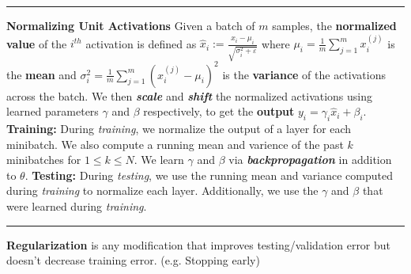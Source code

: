 \documentclass{article}
\renewcommand{\bf}[1]{\textbf{{#1}}}
\renewcommand{\it}[1]{\textit{{#1}}}
\newcommand{\ib}[1]{\textit{\textbf{{#1}}}}
\newcommand{\eps}{\varepsilon}
\begin{document}
\begin{small}
\hrule
\vspace{0.1em}

\bf{Normalizing Unit Activations}
\newline
Given a batch of $m$ samples, the \bf{normalized value} of the $i^{th}$ activation is defined as 
\vspace{-0.5em} 
$\hat{x}_i := \frac{x_i - \mu_i}{\sqrt{\sigma_i^2 + \eps}}$ where 
$\mu_i = \frac{1}{m} \sum_{j = 1}^{m} x_i^{(j)}$ is the \bf{mean} and 
$\sigma_i^2 = \frac{1}{m} \sum_{j = 1}^{m} \left( x_i^{(j)} - \mu_i \right)^2$ is the \bf{variance} 
of the activations across the batch. We then \ib{scale} and \ib{shift} the normalized activations
using learned parameters $\gamma$ and $\beta$ respectively, to get the \bf{output}
$y_i = \gamma_i \hat{x}_i + \beta_i$.
\newline
\bf{Training:} During \it{training}, we normalize the output of a layer for each minibatch. We also
compute a running mean and varience of the past $k$ minibatches for $1 \leq k \leq N$. We learn 
$\gamma$ and $\beta$ via \ib{backpropagation} in addition to $\theta$.
\newline
\bf{Testing:} During \it{testing}, we use the running mean and variance computed during
\it{training} to normalize each layer. Additionally, we use the $\gamma$ and $\beta$ that were
learned during \it{training}.
\vspace{0.1em}

\hrule
\vspace{0.1em}

\bf{Regularization} is any modification that improves testing/validation error but doesn't decrease
training error. (e.g. Stopping early)


\end{small}
\end{document}
